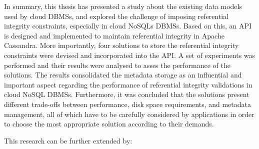 In summary, this thesis has presented a study about the existing data models
used by cloud \acp{DBMS}, and explored the challenge of imposing referential
integrity constraints, especially in cloud \acp{NoSQL} \acp{DBMS}. Based on
this, an \ac{API} is designed and implemented to maintain referential integrity
in Apache Cassandra. More importantly, four solutions to store the referential
integrity constraints were devised and incorporated into the \ac{API}.
A set of experiments was performed and their results  were analysed to asses the
performance of the solutions. The results consolidated the metadata storage as
an influential and important aspect regarding the performance of referential
integrity validations in cloud \ac{NoSQL} \acp{DBMS}.  Furthermore, it was
concluded that the solutions present different trade-offs between performance,
disk space requirements, and metadata management, all of which have to be
carefully considered by  applications in order to choose the most appropriate
solution according to their demands.\newline


This research can be further extended by:


